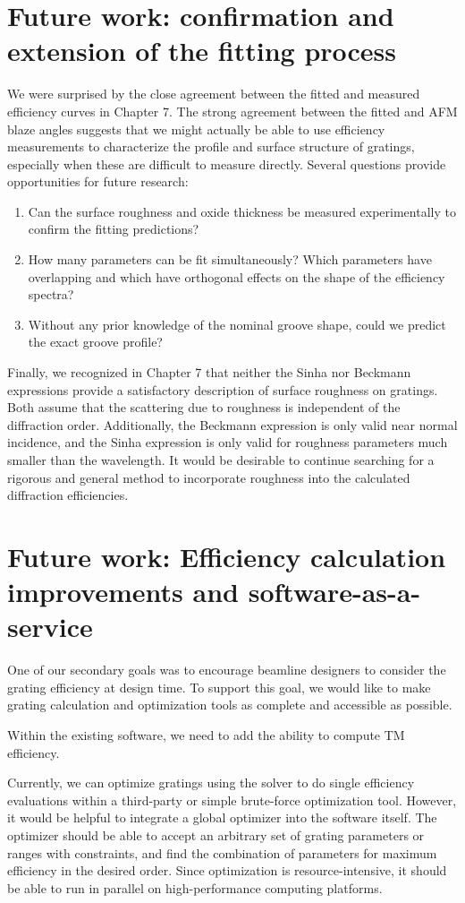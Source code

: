 \section{Future work: confirmation and extension of the fitting process}
We were surprised by the close agreement between the fitted and measured efficiency curves in Chapter 7.  The strong agreement between the fitted and AFM blaze angles suggests that we might actually be able to use efficiency measurements to characterize the profile and surface structure of gratings, especially when these are difficult to measure directly.  Several questions provide opportunities for future research:
\begin{enumerate}
\item Can the surface roughness and oxide thickness be measured experimentally to confirm the fitting predictions?
\item How many parameters can be fit simultaneously? Which parameters have overlapping and which have orthogonal effects on the shape of the efficiency spectra?
\item Without any prior knowledge of the nominal groove shape, could we predict the exact groove profile?
\end{enumerate}

Finally, we recognized in Chapter 7 that neither the Sinha nor Beckmann expressions provide a satisfactory description of surface roughness on gratings.  Both assume that the scattering due to roughness is independent of the diffraction order.  Additionally, the Beckmann expression is only valid near normal incidence, and the Sinha expression is only valid for roughness parameters much smaller than the wavelength.  It would be desirable to continue searching for a rigorous and general method to incorporate roughness into the calculated diffraction efficiencies.

\clearpage
\section{Future work: Efficiency calculation improvements and software-as-a-service}
One of our secondary goals was to encourage beamline designers to consider the grating efficiency at design time.  To support this goal, we would like to make grating calculation and optimization tools as complete and accessible as possible.

Within the existing software, we need to add the ability to compute TM efficiency.

Currently, we can optimize gratings using the solver to do single efficiency evaluations within a third-party or simple brute-force optimization tool.  However, it would be helpful to integrate a global optimizer into the software itself.  The optimizer should be able to accept an arbitrary set of grating parameters or ranges with constraints, and find the combination of parameters for maximum efficiency in the desired order.  Since optimization is resource-intensive, it should be able to run in parallel on high-performance computing platforms.

